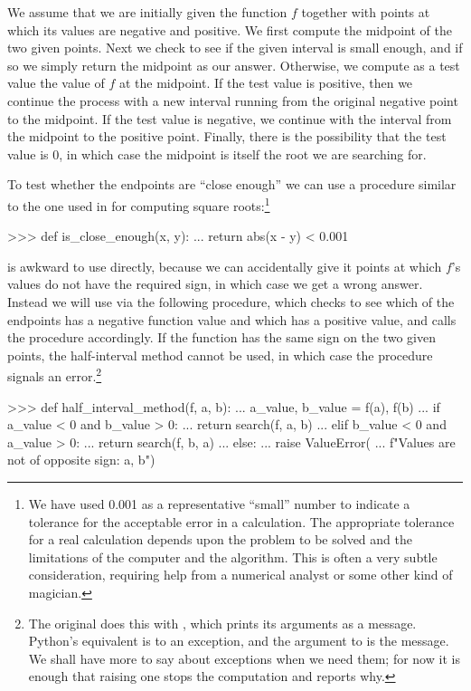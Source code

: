 \noindent
We assume that we are initially given the function \( f \) together with points
at which its values are negative and positive.  We first compute the midpoint
of the two given points.  Next we check to see if the given interval is small
enough, and if so we simply return the midpoint as our answer.  Otherwise, we
compute as a test value the value of \( f \) at the midpoint.  If the test value
is positive, then we continue the process with a new interval running from the
original negative point to the midpoint.  If the test value is negative, we
continue with the interval from the midpoint to the positive point.  Finally,
there is the possibility that the test value is 0, in which case the midpoint
is itself the root we are searching for.

To test whether the endpoints are ``close enough'' we can use a procedure
similar to the one used in  for computing square
roots:\footnote{We have used 0.001 as a representative ``small'' number to
indicate a tolerance for the acceptable error in a calculation.  The
appropriate tolerance for a real calculation depends upon the problem to be
solved and the limitations of the computer and the algorithm.  This is often a
very subtle consideration, requiring help from a numerical analyst or some
other kind of magician.}

\begin{codeBlock}
>>> def is_close_enough(x, y):
...     return abs(x - y) < 0.001
\end{codeBlock}

\noindent
{} is awkward to use directly, because we can accidentally give it
points at which \( f \)'s values do not have the required sign, in which case we
get a wrong answer.  Instead we will use  via the following
procedure, which checks to see which of the endpoints has a negative function
value and which has a positive value, and calls the  procedure
accordingly.  If the function has the same sign on the two given points, the
half-interval method cannot be used, in which case the procedure signals an
error.\footnote{The original does this with , which prints its
arguments as a message.  Python's equivalent is to  an
exception, and the argument to  is the message.  We shall
have more to say about exceptions when we need them; for now it is enough that
raising one stops the computation and reports why.}

\begin{codeBlock}
>>> def half_interval_method(f, a, b):
...     a_value, b_value = f(a), f(b)
...     if a_value < 0 and b_value > 0:
...         return search(f, a, b)
...     elif b_value < 0 and a_value > 0:
...         return search(f, b, a)
...     else:
...         raise ValueError(
...             f"Values are not of opposite sign: {a}, {b}")
\end{codeBlock}

